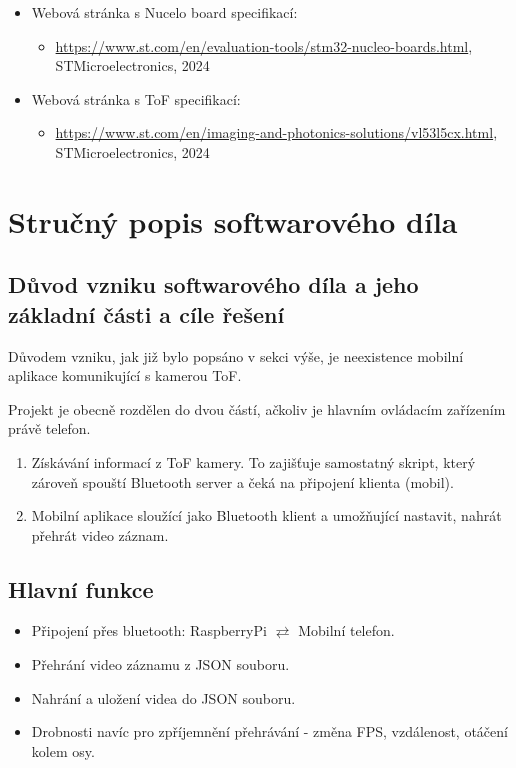 \documentclass[12pt,a4paper]{article}
\begin{document}
\begin{itemize}\setlength\itemsep{0em}
	\item Webová stránka s Nucelo board specifikací: \begin{itemize}\setlength\itemsep{0em}
		\item {\footnotesize \href{https://www.st.com/en/evaluation-tools/stm32-nucleo-boards.html}{https://www.st.com/en/evaluation-tools/stm32-nucleo-boards.html}, STMicroelectronics, 2024}
	\end{itemize}
	\item Webová stránka s ToF specifikací: \begin{itemize}\setlength\itemsep{0em}
		\item {\footnotesize \href{https://www.st.com/en/imaging-and-photonics-solutions/vl53l5cx.html}{https://www.st.com/en/imaging-and-photonics-solutions/vl53l5cx.html}, STMicroelectronics, 2024}
	\end{itemize}
\end{itemize}

\newpage
\section{Stručný popis softwarového díla}

\subsection{Důvod vzniku softwarového díla a jeho základní části a cíle řešení}

Důvodem vzniku, jak již bylo popsáno v sekci výše, je neexistence mobilní aplikace komunikující s kamerou ToF.

Projekt je obecně rozdělen do dvou částí, ačkoliv je hlavním ovládacím zařízením právě telefon.
\begin{enumerate}
	\item Získávání informací z ToF kamery. To zajišťuje samostatný skript, který zároveň spouští Bluetooth server a čeká na připojení klienta (mobil).
	\item Mobilní aplikace sloužící jako Bluetooth klient a umožňující nastavit, nahrát  přehrát video záznam.
\end{enumerate}

\subsection{Hlavní funkce}
\begin{itemize}
	\item Připojení přes bluetooth: RaspberryPi $ \rightleftarrows $ Mobilní telefon.
	\item Přehrání video záznamu z JSON souboru.
	\item Nahrání a uložení videa do JSON souboru.
	\item Drobnosti navíc pro zpříjemnění přehrávání - změna FPS, vzdálenost, otáčení kolem osy.
\end{itemize}
\end{document}
